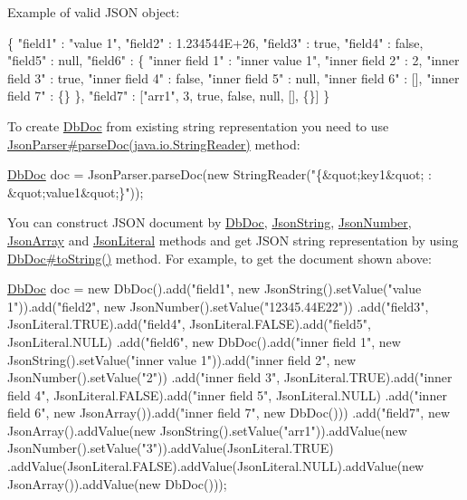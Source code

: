 Example of valid J\+S\+ON object\+:


\begin{DoxyPre}
\{
"field1" : "value 1",
"field2" : 1.234544E+26,
"field3" : true,
"field4" : false,
"field5" : null,
"field6" : \{
           "inner field 1" : "inner value 1",
           "inner field 2" : 2,
           "inner field 3" : true,
           "inner field 4" : false,
           "inner field 5" : null,
           "inner field 6" : [],
           "inner field 7" : \{\}
           \},
"field7" : ["arr1", 3, true, false, null, [], \{\}]
\}
\end{DoxyPre}


To create \mbox{\hyperlink{interfacecom_1_1mysql_1_1cj_1_1xdevapi_1_1_db_doc}{Db\+Doc}} from existing string representation you need to use \mbox{\hyperlink{}{Json\+Parser\#parse\+Doc(java.\+io.\+String\+Reader)}} method\+:


\begin{DoxyPre}
\mbox{\hyperlink{interfacecom_1_1mysql_1_1cj_1_1xdevapi_1_1_db_doc}{DbDoc}} doc = JsonParser.parseDoc(new StringReader("\{\&quot;key1\&quot; : \&quot;value1\&quot;\}"));
\end{DoxyPre}


You can construct J\+S\+ON document by \mbox{\hyperlink{interfacecom_1_1mysql_1_1cj_1_1xdevapi_1_1_db_doc}{Db\+Doc}}, \mbox{\hyperlink{classcom_1_1mysql_1_1cj_1_1xdevapi_1_1_json_string}{Json\+String}}, \mbox{\hyperlink{classcom_1_1mysql_1_1cj_1_1xdevapi_1_1_json_number}{Json\+Number}}, \mbox{\hyperlink{classcom_1_1mysql_1_1cj_1_1xdevapi_1_1_json_array}{Json\+Array}} and \mbox{\hyperlink{enumcom_1_1mysql_1_1cj_1_1xdevapi_1_1_json_literal}{Json\+Literal}} methods and get J\+S\+ON string representation by using \mbox{\hyperlink{}{Db\+Doc\#to\+String()}} method. For example, to get the document shown above\+:


\begin{DoxyPre}
\mbox{\hyperlink{interfacecom_1_1mysql_1_1cj_1_1xdevapi_1_1_db_doc}{DbDoc}} doc = new DbDoc().add("field1", new JsonString().setValue("value 1")).add("field2", new JsonNumber().setValue("12345.44E22"))
        .add("field3", JsonLiteral.TRUE).add("field4", JsonLiteral.FALSE).add("field5", JsonLiteral.NULL)
        .add("field6",
                new DbDoc().add("inner field 1", new JsonString().setValue("inner value 1")).add("inner field 2", new JsonNumber().setValue("2"))
                        .add("inner field 3", JsonLiteral.TRUE).add("inner field 4", JsonLiteral.FALSE).add("inner field 5", JsonLiteral.NULL)
                        .add("inner field 6", new JsonArray()).add("inner field 7", new DbDoc()))
        .add("field7", new JsonArray().addValue(new JsonString().setValue("arr1")).addValue(new JsonNumber().setValue("3")).addValue(JsonLiteral.TRUE)
                .addValue(JsonLiteral.FALSE).addValue(JsonLiteral.NULL).addValue(new JsonArray()).addValue(new DbDoc()));\end{DoxyPre}



